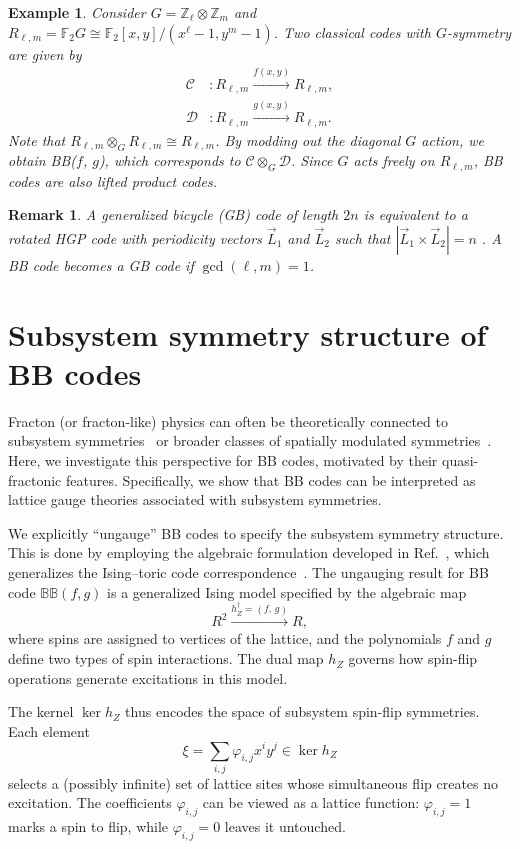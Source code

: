 \documentclass[aps,prl,english,superscriptaddress,twocolumn,tightenlines,showpacs,longbibliography,floatfix,amsfonts]{revtex4-2}
\newtheorem{rem}{Remark}
\newtheorem{ex}{Example}
\begin{document}
\begin{ex}\cite{Eberhardt24}
	Consider $G=\mathbb{Z}_\ell \otimes \mathbb{Z}_m$ and $R_{\ell,m} = \mathbb{F}_2 G \cong \mathbb{F}_2[x,y]/(x^\ell -1, y^m-1)$. Two classical codes with $G$-symmetry are given by
	\begin{align}
		\mathcal{C}&: R_{\ell,m} \xrightarrow{f(x,y)} R_{\ell,m}, \\
		\mathcal{D}&: R_{\ell,m} \xrightarrow{g(x,y)} R_{\ell,m}.
	\end{align}
	Note that $R_{\ell,m}\otimes_G R_{\ell,m} \cong R_{\ell,m}$. By modding out the diagonal $G$ action, we obtain BB($f$, $g$), which corresponds to $\mathcal{C} \otimes_G \mathcal{D}$. Since $G$ acts freely on $R_{\ell,m}$, BB codes are also lifted product codes.
\end{ex}
\begin{rem}
	A generalized bicycle (GB) code of length $2 n$ is equivalent to a rotated HGP code with periodicity vectors $\vec{L}_1$ and $\vec{L}_2$ such that $|\vec{L}_1 \times \vec{L}_2|=n$ \cite{Wang22}. A BB code becomes a GB code if $\gcd(\ell, m)=1$.
\end{rem}

\section{Subsystem symmetry structure of BB codes}

Fracton (or fracton-like) physics can often be theoretically connected to subsystem symmetries~\cite{Vijay16} or broader classes of spatially modulated symmetries~\cite{Sala22,Delfino2024}. Here, we investigate this perspective for BB codes, motivated by their quasi-fractonic features. Specifically, we show that BB codes can be interpreted as lattice gauge theories associated with subsystem symmetries.

We explicitly ``ungauge'' BB codes to specify the subsystem symmetry
structure. This is done by employing the algebraic formulation developed
in Ref.~\cite{Vijay16}, which generalizes the Ising--toric code
correspondence~\cite{Vijay16,Canossa24}. The ungauging result for BB code $\mathbb{BB}\left(f,g\right)$
is a generalized Ising model specified by the algebraic map
\[
R^{2}\xrightarrow{h_{Z}^{\dagger}=(f,\,g)}R,
\]
where spins are assigned to vertices of the lattice, and the polynomials
$f$ and $g$ define two types of spin interactions. The dual map
$h_{Z}$ governs how spin-flip operations generate excitations in
this model. 



The kernel \( \ker h_Z \) thus encodes the space of subsystem spin-flip symmetries. Each element
\[
\xi = \sum_{i,j} \varphi_{i,j} x^i y^j \in \ker h_Z
\]
selects a (possibly infinite) set of lattice sites whose simultaneous flip creates no excitation. The coefficients \( \varphi_{i,j} \) can be viewed as a lattice function: \(\varphi_{i,j}=1\) marks a spin to flip, while \(\varphi_{i,j}=0\) leaves it untouched.



	
\end{document}
